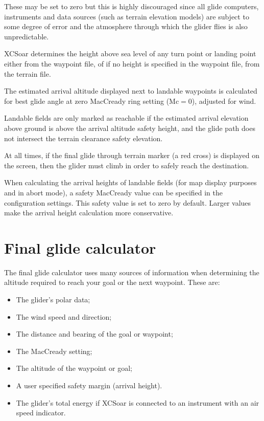 \documentclass[a4paper,12pt]{refrep}
\begin{document}
\warning
These may be set to zero but this is highly discouraged since all
glide computers, instruments and data sources (such as terrain
elevation models) are subject to some degree of error and the
atmosphere through which the glider flies is also unpredictable.

XCSoar determines the height above sea level of any turn point or
landing point either from the waypoint file, of if no height is
specified in the waypoint file, from the terrain file.

The estimated arrival altitude displayed next to landable waypoints is
calculated for best glide angle at zero MacCready ring setting
(Mc$=0$), adjusted for wind.

Landable fields are only marked as reachable if the estimated arrival
elevation above ground is above the arrival altitude safety height,
and the glide path does not intersect the terrain clearance safety
elevation.

At all times, if the final glide through terrain marker (a red
cross) is displayed on the screen, then the glider must climb in order
to safely reach the destination.

When calculating the arrival heights of landable fields (for map
display purposes and in abort mode), a safety MacCready value can be
specified in the configuration settings.  This safety value is set to
zero by default.  Larger values make the arrival height calculation
more conservative.

\section{Final glide calculator}

The final glide calculator uses many sources of information when
determining the altitude required to reach your goal or the next
waypoint. These are:

\begin{itemize}
\item The glider's polar data;
\item The wind speed and direction;
\item The distance and bearing of the goal or waypoint;
\item The MacCready setting;
\item The altitude of the waypoint or goal;
\item A user specified safety margin (arrival height).
\item The glider's total energy if XCSoar is connected to
  an instrument with an air speed indicator.
\end{itemize}
\end{document}
